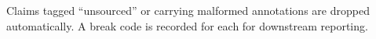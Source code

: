\noindent Claims tagged ``unsourced'' or carrying malformed annotations are dropped automatically. A break code is recorded for each for downstream reporting.

